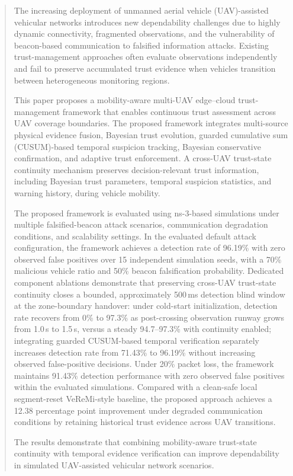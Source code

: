 \documentclass[journal]{IEEEtran}
\begin{document}
\begin{abstract}

The increasing deployment of unmanned aerial vehicle (UAV)-assisted vehicular
networks introduces new
dependability challenges due to highly dynamic connectivity, fragmented
observations, and the vulnerability of beacon-based communication to
falsified information attacks. Existing trust-management approaches often
evaluate observations independently and fail to preserve accumulated trust
evidence when vehicles transition between heterogeneous monitoring regions.

This paper proposes a mobility-aware multi-UAV edge--cloud trust-management
framework that enables continuous trust assessment across UAV coverage
boundaries. The proposed framework integrates multi-source physical evidence
fusion, Bayesian trust evolution, guarded cumulative sum (CUSUM)-based
temporal suspicion tracking, Bayesian conservative confirmation, and adaptive trust
enforcement. A cross-UAV trust-state continuity mechanism preserves
decision-relevant trust information, including Bayesian trust parameters,
temporal suspicion statistics, and warning history, during vehicle mobility.

The proposed framework is evaluated using ns-3-based simulations under
multiple falsified-beacon attack scenarios, communication degradation
conditions, and scalability settings. In the evaluated default attack
configuration, the framework achieves a detection rate of 96.19\% with zero
observed false positives over 15 independent simulation seeds, with a 70\%
malicious vehicle ratio and 50\% beacon falsification probability. Dedicated
component ablations demonstrate that preserving cross-UAV trust-state
continuity closes a bounded, approximately 500\,ms detection blind
window at the zone-boundary handover: under cold-start initialization,
detection rate recovers from 0\% to 97.3\% as post-crossing observation
runway grows from 1.0\,s to 1.5\,s, versus a steady 94.7--97.3\% with
continuity enabled; integrating guarded CUSUM-based temporal
verification separately increases detection rate from 71.43\% to
96.19\% without increasing observed false-positive decisions.
Under 20\% packet loss, the framework maintains 91.43\% detection performance
with zero observed false positives within the evaluated simulations.
Compared with a clean-safe local segment-reset
VeReMi-style baseline, the proposed approach achieves a 12.38 percentage
point improvement under degraded communication conditions by retaining
historical trust evidence across UAV transitions.

The results demonstrate that combining mobility-aware trust-state continuity
with temporal evidence verification can improve dependability in simulated
UAV-assisted vehicular network scenarios.

\end{abstract}
\end{document}
